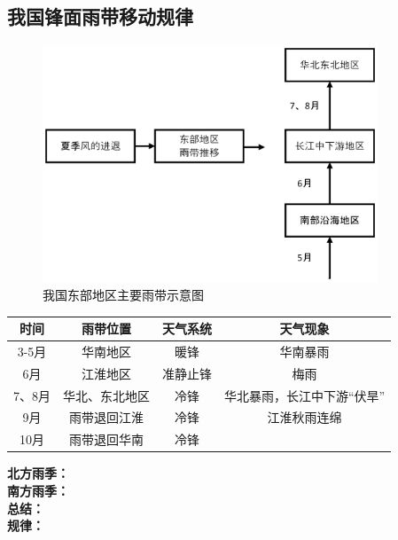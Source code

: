 \documentclass[UTF8]{ctexart}
\begin{document}
    \subsection*{我国锋面雨带移动规律}

    \begin{figure}[h]
        \centering
        \includegraphics[width=10cm]{img/1-2.png}
        \caption{我国东部地区主要雨带示意图}
    \end{figure}

    \begin{table}[h]
        \begin{center}
            \begin{tabular}{ |c|c|c|c| }
                \hline 时间 & 雨带位置 & 天气系统 & 天气现象 \\
                \hline 3-5月 & 华南地区 & 暖锋 & 华南暴雨 \\
                \hline 6月 & 江淮地区 & 准静止锋 & 梅雨 \\
                \hline 7、8月 & 华北、东北地区 & 冷锋 & 华北暴雨，长江中下游“伏旱” \\
                \hline 9月 & 雨带退回江淮 & 冷锋 & 江淮秋雨连绵 \\
                \hline 10月 & 雨带退回华南 & 冷锋 &  \\
                \hline
            \end{tabular}
        \end{center}
    \end{table}

    \noindent
    \textbf{北方雨季：}
    \\
    \textbf{南方雨季：}
    \\
    \textbf{总结：}
    \\
    \textbf{规律：}
\end{document}
